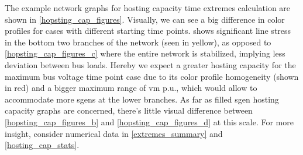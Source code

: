 \documentclass[a4paper,10pt]{report}
\begin{document}
The example network graphs for hosting capacity time extremes calculation are shown in \cref{hopsting_cap_figures}. Visually, we can see a big difference in color profiles for cases with different starting time points.  shows significant line stress in the bottom two branches of the network (seen in yellow), as opposed to \cref{hopsting_cap_figures_c} where the entire network is stabilized, implying less deviation between bus loads. Hereby we expect a greater hosting capacity for the maximum bus voltage time point case due to its color profile homogeneity (shown in red) and a bigger maximum range of vm p.u., which would allow to accommodate more sgens at the lower branches. As far as filled sgen hosting capacity graphs are concerned, there's little visual difference between \cref{hopsting_cap_figures_b} and \cref{hopsting_cap_figures_d} at this scale. For more insight, consider numerical data in \cref{extremes_summary} and \cref{hosting_cap_stats}.
\end{document}
